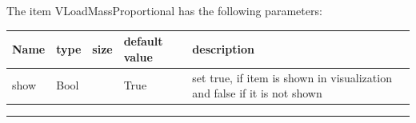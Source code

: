 \noindent The item VLoadMassProportional has the following parameters:
\begin{center}
  \footnotesize
  \begin{longtable}{| p{4.5cm} | p{2.5cm} | p{0.5cm} | p{2.5cm} | p{6cm} |}
    \hline
    \bf Name & \bf type & \bf size & \bf default value & \bf description \\ \hline
    show &     Bool &      &     True &     set true, if item is shown in visualization and false if it is not shown\\ \hline
\end{longtable}
\end{center}
\par\noindent\rule{\textwidth}{0.4pt}
\label{description_LoadMassProportional}

